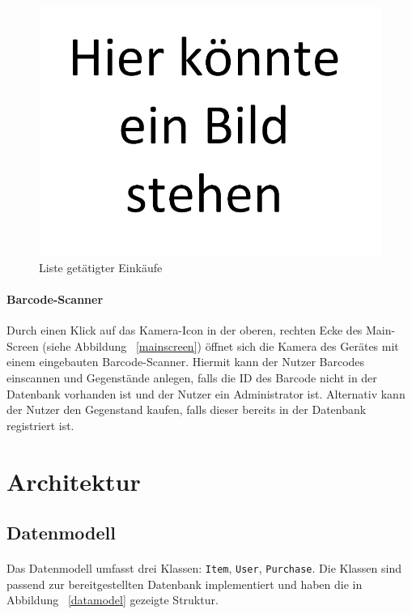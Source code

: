 \documentclass{scrartcl}
\begin{document}
		\begin{figure}[!h]
			\centering
			\includegraphics[scale=0.5]{./figures/placeholder.png}
			\caption{Liste getätigter Einkäufe}
			\label{purchases}
		\end{figure}	
	
		\paragraph*{Barcode-Scanner}
		Durch einen Klick auf das Kamera-Icon in der oberen, rechten Ecke des Main-Screen (siehe Abbildung ~\ref{mainscreen}) öffnet sich die Kamera des Gerätes mit einem eingebauten Barcode-Scanner. Hiermit kann der Nutzer Barcodes einscannen und Gegenstände anlegen, falls die ID des Barcode nicht in der Datenbank vorhanden ist und der Nutzer ein Administrator ist. Alternativ kann der Nutzer den Gegenstand kaufen, falls dieser bereits in der Datenbank registriert ist.
	
	\section{Architektur} \label{architecture}
		\subsection{Datenmodell} \label{architecture::datamodel}
			\paragraph*{}
			Das Datenmodell umfasst drei Klassen: \texttt{Item}, \texttt{User}, \texttt{Purchase}. Die Klassen sind passend zur bereitgestellten Datenbank implementiert und haben die in Abbildung ~\ref{datamodel} gezeigte Struktur.
		
\end{document}
